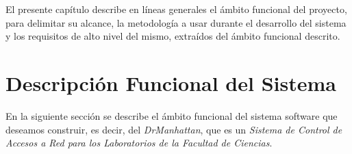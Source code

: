 ﻿%


\label{chap:planificacion}


El presente cap\'itulo describe en líneas generales el ámbito funcional del proyecto, para delimitar su alcance, la metodología a usar durante el desarrollo del sistema y los requisitos de alto nivel del mismo, extraídos del ámbito funcional descrito.

\chaptertoc

\section{Descripción Funcional del Sistema}
\label{sec:planificacion:descFuncional}

En la siguiente sección se describe el ámbito funcional del sistema software que deseamos construir, es decir, del \emph{DrManhattan}, que es un \emph{Sistema de Control de Accesos a Red para los Laboratorios de la Facultad de Ciencias}.\newline


